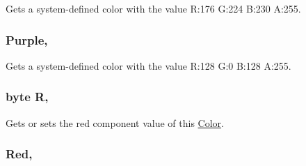 Gets a system-\/defined color with the value R\+:176 G\+:224 B\+:230 A\+:255.

\hypertarget{structMicrosoft_1_1Xna_1_1Framework_1_1Color_a5b1970e101009b75c1a49383f01c9672}{}
\subsubsection[{Purple}]{ Purple\hspace{0.3cm}{\ttfamily [static]}, {\ttfamily [get]}}\label{structMicrosoft_1_1Xna_1_1Framework_1_1Color_a5b1970e101009b75c1a49383f01c9672}


Gets a system-\/defined color with the value R\+:128 G\+:0 B\+:128 A\+:255.

\hypertarget{structMicrosoft_1_1Xna_1_1Framework_1_1Color_a9899281d9638e30c6a5ed7ec4e6af4f4}{}
\subsubsection[{R}]{\setlength{\rightskip}{0pt plus 5cm}byte R\hspace{0.3cm}{\ttfamily [get]}, {\ttfamily [set]}}\label{structMicrosoft_1_1Xna_1_1Framework_1_1Color_a9899281d9638e30c6a5ed7ec4e6af4f4}


Gets or sets the red component value of this \hyperlink{structMicrosoft_1_1Xna_1_1Framework_1_1Color}{Color}.

\hypertarget{structMicrosoft_1_1Xna_1_1Framework_1_1Color_a87a605a75f99f27ebe26ae418abc548f}{}
\subsubsection[{Red}]{ Red\hspace{0.3cm}{\ttfamily [static]}, {\ttfamily [get]}}\label{structMicrosoft_1_1Xna_1_1Framework_1_1Color_a87a605a75f99f27ebe26ae418abc548f}


